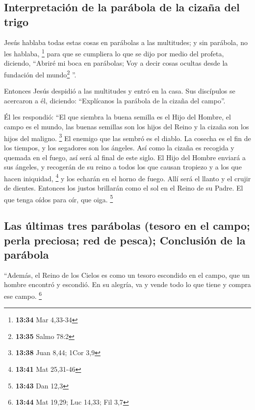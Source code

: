\begin{paracol}{2}
\hypertarget{interpretaciuxf3n-de-la-paruxe1bola-de-la-cizauxf1a-del-trigo}{%
\subsection{Interpretación de la parábola de la cizaña del
trigo}\label{interpretaciuxf3n-de-la-paruxe1bola-de-la-cizauxf1a-del-trigo}}

 Jesús hablaba todas estas cosas en parábolas a las
multitudes; y sin parábola, no les hablaba, \footnote{\textbf{13:34} Mar
  4,33-34}  para que se cumpliera lo que se dijo por
medio del profeta, diciendo, ``Abriré mi boca en parábolas; Voy a decir
cosas ocultas desde la fundación del mundo\footnote{\textbf{13:35} Salmo
  78:2} ''.

 Entonces Jesús despidió a las multitudes y entró en la
casa. Sus discípulos se acercaron a él, diciendo: ``Explícanos la
parábola de la cizaña del campo''.

 Él les respondió: ``El que siembra la buena semilla es
el Hijo del Hombre,  el campo es el mundo, las buenas
semillas son los hijos del Reino y la cizaña son los hijos del maligno.
\footnote{\textbf{13:38} Juan 8,44; 1Cor 3,9}  El enemigo
que las sembró es el diablo. La cosecha es el fin de los tiempos, y los
segadores son los ángeles.  Así como la cizaña es
recogida y quemada en el fuego, así será al final de este siglo.
 El Hijo del Hombre enviará a sus ángeles, y recogerán de
su reino a todos los que causan tropiezo y a los que hacen iniquidad,
\footnote{\textbf{13:41} Mat 25,31-46}  y los echarán en
el horno de fuego. Allí será el llanto y el crujir de dientes.
 Entonces los justos brillarán como el sol en el Reino de
su Padre. El que tenga oídos para oír, que oiga. \footnote{\textbf{13:43}
  Dan 12,3}

\hypertarget{las-uxfaltimas-tres-paruxe1bolas-tesoro-en-el-campo-perla-preciosa-red-de-pesca-conclusiuxf3n-de-la-paruxe1bola}{%
\subsection{Las últimas tres parábolas (tesoro en el campo; perla
preciosa; red de pesca); Conclusión de la
parábola}\label{las-uxfaltimas-tres-paruxe1bolas-tesoro-en-el-campo-perla-preciosa-red-de-pesca-conclusiuxf3n-de-la-paruxe1bola}}

 ``Además, el Reino de los Cielos es como un tesoro
escondido en el campo, que un hombre encontró y escondió. En su alegría,
va y vende todo lo que tiene y compra ese campo. \footnote{\textbf{13:44}
  Mat 19,29; Luc 14,33; Fil 3,7}


\end{paracol}
